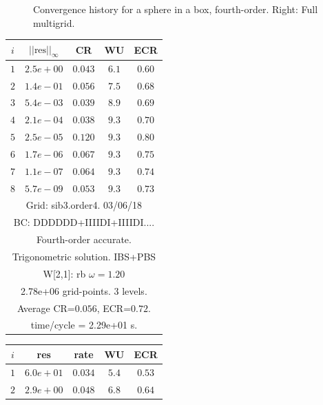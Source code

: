 \documentclass{article}
\begin{document}
\begin{figure}
\begin{center}
\end{center}
\caption{Convergence history for a sphere in a box, fourth-order. Right: Full multigrid.}
\label{fig:sib3.order4}
\end{figure}

\begin{table}[hbt]
\begin{center}
{\tablefontsize
\begin{tabular}{|c|c|c|c|c|} \hline 
 $i$   & $\vert\vert\mbox{res}\vert\vert_\infty$  &  CR     &  WU    & ECR  \\   \hline 
 $ 1$  & $ 2.5e+00$ & $0.043$ & $ 6.1$ & $0.60$ \\ 
 $ 2$  & $ 1.4e-01$ & $0.056$ & $ 7.5$ & $0.68$ \\ 
 $ 3$  & $ 5.4e-03$ & $0.039$ & $ 8.9$ & $0.69$ \\ 
 $ 4$  & $ 2.1e-04$ & $0.038$ & $ 9.3$ & $0.70$ \\ 
 $ 5$  & $ 2.5e-05$ & $0.120$ & $ 9.3$ & $0.80$ \\ 
 $ 6$  & $ 1.7e-06$ & $0.067$ & $ 9.3$ & $0.75$ \\ 
 $ 7$  & $ 1.1e-07$ & $0.064$ & $ 9.3$ & $0.74$ \\ 
 $ 8$  & $ 5.7e-09$ & $0.053$ & $ 9.3$ & $0.73$ \\ 
\hline 
\multicolumn{5}{|c|}{Grid: sib3.order4. 03/06/18}  \\
\multicolumn{5}{|c|}{BC: DDDDDD+IIIIDI+IIIIDI....}  \\
\multicolumn{5}{|c|}{Fourth-order accurate.}  \\
\multicolumn{5}{|c|}{Trigonometric solution. IBS+PBS}  \\
\multicolumn{5}{|c|}{W[2,1]: rb $\omega=1.20$}  \\
\multicolumn{5}{|c|}{2.78e+06 grid-points. 3 levels.}  \\
\multicolumn{5}{|c|}{Average CR=$0.056$, ECR=$0.72$.}  \\
\multicolumn{5}{|c|}{time/cycle = 2.29e+01 s.}  \\
\hline 
\end{tabular}
\begin{tabular}{|c|c|c|c|c|} \hline 
 $i$   & res      & rate    &  WU    & ECR  \\   \hline 
 $ 1$  & $ 6.0e+01$ & $0.034$ & $ 5.4$ & $0.53$ \\ 
 $ 2$  & $ 2.9e+00$ & $0.048$ & $ 6.8$ & $0.64$ \\ 

\end{tabular}}
\end{center}
\end{table}
\end{document}
